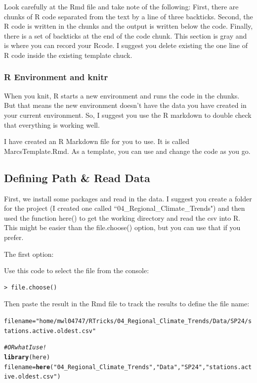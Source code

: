 \documentclass{article}\usepackage[]{graphicx}\usepackage[dvipsnames]{xcolor}
\makeatletter
\newcommand{\hlstr}[1]{\textcolor[rgb]{0.192,0.494,0.8}{#1}}%
\newcommand{\hlcom}[1]{\textcolor[rgb]{0.678,0.584,0.686}{\textit{#1}}}%
\newcommand{\hlstd}[1]{\textcolor[rgb]{0.345,0.345,0.345}{#1}}%
\newcommand{\hlkwb}[1]{\textcolor[rgb]{0.69,0.353,0.396}{#1}}%
\newcommand{\hlkwd}[1]{\textcolor[rgb]{0.737,0.353,0.396}{\textbf{#1}}}%
\newenvironment{kframe}{%
 \def\at@end@of@kframe{}%
 \ifinner\ifhmode%
  \def\at@end@of@kframe{\end{minipage}}%
  \begin{minipage}{\columnwidth}%
 \fi\fi%
 \def\FrameCommand##1{\hskip\@totalleftmargin \hskip-\fboxsep
 \colorbox{shadecolor}{##1}\hskip-\fboxsep
     \hskip-\linewidth \hskip-\@totalleftmargin \hskip\columnwidth}%
 \MakeFramed {\advance\hsize-\width
   \@totalleftmargin\z@ \linewidth\hsize
   \@setminipage}}%
 {\par\unskip\endMakeFramed%
 \at@end@of@kframe}
\newenvironment{knitrout}{}{} %
\makeatother
\begin{document}
Look carefully at the Rmd file and take note of the following: First, there are chunks of R code separated from the text by a line of three backticks. Second, the R code is written in the chunks and the output is written below the code. Finally, there is a set of backticks at the end of the code chunk. This section is gray and is where you can record your Rcode. I suggest you delete existing the one line of R code inside the existing template chuck.  

\subsubsection{R Environment and knitr}

When you knit, R starts a new environment and runs the code in the chunks. But that means the new environment doesn't have the data you have created in your current environment. So, I suggest you use the R markdown to double check that everything is working well. 

I have created an R Markdown file for you to use. It is called MarcsTemplate.Rmd. As a template, you can use and change the code as you go. 

\subsection{Defining Path \& Read Data}

First, we install some packages and read in the data. I suggest you create a folder for the project (I created one called ``04\_Regional\_Climate\_Trends") and then used the function here() to get the working directory and read the csv into R. This might be easier than the file.choose() option, but you can use that if you prefer.

The first option: 

Use this code to select the file from the console:

\begin{verbatim}
> file.choose()
\end{verbatim}

Then paste the result in the Rmd file to track the results to define the file name:

\begin{knitrout}
\color{fgcolor}\begin{kframe}
\begin{alltt}
\hlstd{filename} \hlkwb{=} \hlstr{"home/mwl04747/RTricks/04_Regional_Climate_Trends/Data/SP24/stations.active.oldest.csv"}


\hlcom{# OR what I use! }
\hlkwd{library}\hlstd{(here)}
\hlstd{filename} \hlkwb{=} \hlkwd{here}\hlstd{(}\hlstr{"04_Regional_Climate_Trends"}\hlstd{,} \hlstr{"Data"}\hlstd{,} \hlstr{"SP24"}\hlstd{,} \hlstr{"stations.active.oldest.csv"}\hlstd{)}
\end{alltt}
\end{kframe}
\end{knitrout}
\end{document}
